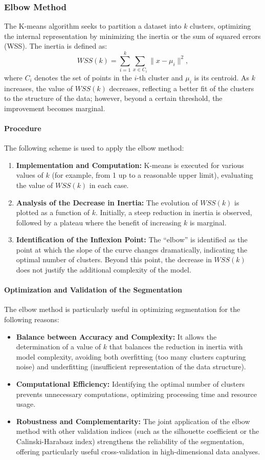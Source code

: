 \documentclass[10pt]{article}
\begin{document}
\subsubsection{Elbow Method}
The K-means algorithm seeks to partition a dataset into $k$ clusters, optimizing the internal representation by minimizing the inertia or the sum of squared errors (WSS). The inertia is defined as:
\[
WSS(k) = \sum_{i=1}^{k} \sum_{x \in C_i} \|x - \mu_i\|^2,
\]
where $C_i$ denotes the set of points in the $i$-th cluster and $\mu_i$ is its centroid. As $k$ increases, the value of $WSS(k)$ decreases, reflecting a better fit of the clusters to the structure of the data; however, beyond a certain threshold, the improvement becomes marginal.

\paragraph{Procedure} The following scheme is used to apply the elbow method:
\begin{enumerate}
    \item \textbf{Implementation and Computation:} K-means is executed for various values of $k$ (for example, from 1 up to a reasonable upper limit), evaluating the value of $WSS(k)$ in each case.
    \item \textbf{Analysis of the Decrease in Inertia:} The evolution of $WSS(k)$ is plotted as a function of $k$. Initially, a steep reduction in inertia is observed, followed by a plateau where the benefit of increasing $k$ is marginal.
    \item \textbf{Identification of the Inflexion Point:} The “elbow” is identified as the point at which the slope of the curve changes dramatically, indicating the optimal number of clusters. Beyond this point, the decrease in $WSS(k)$ does not justify the additional complexity of the model.
\end{enumerate}

\paragraph{Optimization and Validation of the Segmentation}  
The elbow method is particularly useful in optimizing segmentation for the following reasons:
\begin{itemize}
    \item \textbf{Balance between Accuracy and Complexity:} It allows the determination of a value of $k$ that balances the reduction in inertia with model complexity, avoiding both overfitting (too many clusters capturing noise) and underfitting (insufficient representation of the data structure).
    \item \textbf{Computational Efficiency:} Identifying the optimal number of clusters prevents unnecessary computations, optimizing processing time and resource usage.
    \item \textbf{Robustness and Complementarity:} The joint application of the elbow method with other validation indices (such as the silhouette coefficient or the Calinski-Harabasz index) strengthens the reliability of the segmentation, offering particularly useful cross-validation in high-dimensional data analyses.
\end{itemize}
\end{document}
